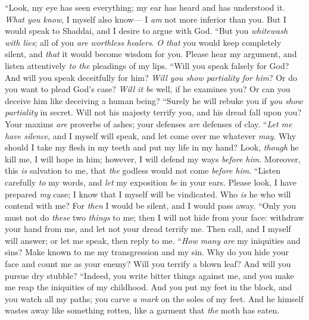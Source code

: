 \begin{biblechapter} %
 “Look, my eye has seen everything; 
my ear has heard and has understood it.
\verse \textit{What you know}, I myself also know— 
I \textit{am} not more inferior than you.
\verse But I would speak to Shaddai, 
and I desire to argue with God.
\verse “But you \textit{whitewash with lies}; 
all of you \textit{are} \textit{worthless healers}.
\verse \textit{O that} you would keep completely silent, 
and \textit{that} it would become wisdom for you.
\verse Please hear my argument, 
and listen attentively \textit{to the} pleadings of my lips.
\verse “Will you speak falsely for God? 
And will you speak deceitfully for him?
\verse \textit{Will you show partiality for him}? 
Or do you want to plead God’s case?
\verse \textit{Will it be} well, if he examines you? 
Or can you deceive him like deceiving a human being?
\verse “Surely he will rebuke you 
if \textit{you show partiality} in secret.
\verse Will not his majesty terrify you, 
and his dread fall upon you?
\verse Your maxims \textit{are} proverbs of ashes; 
your defenses \textit{are} defenses of clay.
\verse “\textit{Let me have silence}, and I myself will speak, 
and let come over me whatever \textit{may}.
\verse Why should I take my flesh in my teeth 
and put my life in my hand?
\verse Look, \textit{though} he kill me, I will hope in him; 
however, I will defend my ways \textit{before him}.
\verse Moreover, this \textit{is} salvation to me, 
that \textit{the} godless would not come \textit{before him}.
\verse “Listen carefully \textit{to} my words, 
and \textit{let} my exposition \textit{be} in your ears.
\verse Please look, I have prepared \textit{my} case; 
I know that I myself will be vindicated.
\verse Who \textit{is} he who will contend with me? 
For \textit{then} I would be silent, and I would pass away.
 “Only you must not do \textit{these} two \textit{things} to me; 
then I will not hide from your face:
\verse withdraw your hand from me, 
and let not your dread terrify me.
\verse Then call, and I myself will answer; 
or let me speak, then reply to me.
\verse “\textit{How many} \textit{are} my iniquities and sins? 
Make known to me my transgression and my sin.
\verse Why do you hide your face 
and count me as your enemy?
\verse Will you terrify a blown leaf? 
And will you pursue dry stubble?
\verse “Indeed, you write bitter things against me, 
and you make me reap the iniquities of my childhood.
\verse And you put my feet in the block, 
and you watch all my paths; 
you carve \textit{a mark} on the soles of my feet.
\verse And he himself wastes away like something rotten, 
like a garment that \textit{the} moth has eaten.
\end{biblechapter}

